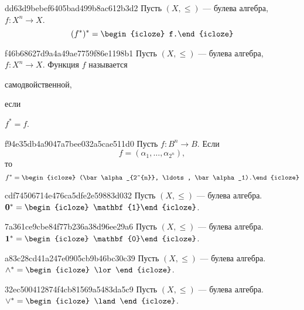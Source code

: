 \begin{note}{dd63d9bebef6405bad499b8ac612b3d2}
    Пусть \({ (X, \leqslant) }\) --- булева алгебра, \({ f : X^{n} \to X }\).
    \[
        (f^*)^* = \begin{icloze}{1}f.\end{icloze}
    \]
\end{note}

\begin{note}{f46b68627d9a4a49ae7759f86e1198b1}
    Пусть \({ (X, \leqslant) }\) --- булева алгебра, \({ f : X^{n} \to X }\).
    Функция \({ f }\) называется \begin{icloze}{1}самодвойственной,\end{icloze} если \begin{icloze}{2}\({ f^* = f }\).\end{icloze}
\end{note}

\begin{note}{f94e35db4a9047a7bee032a5cae511d0}
    Пусть \({ f : B^{n} \to B }\).
    Если
    \[
        f = (\alpha_1, \ldots, \alpha_{2^{n}}),
    \]
    то
    \[
        f^* = \begin{icloze}{1}(\bar \alpha_{2^{n}}, \ldots, \bar \alpha_1).\end{icloze}
    \]
\end{note}

\begin{note}{cdf74506714e476ca5dfe2e59883d032}
    Пусть \({ (X, \leqslant) }\) --- булева алгебра. \({ \mathbf{0}^* = \begin{icloze}{1}\mathbf{1}\end{icloze} }\).
\end{note}

\begin{note}{7a361ce9cbe84f77b236a38d96ee29a6}
    Пусть \({ (X, \leqslant) }\) --- булева алгебра. \({ \mathbf{1}^* = \begin{icloze}{1}\mathbf{0}\end{icloze} }\).
\end{note}

\begin{note}{a83c28cd41a247e0905cb9b46bc30c39}
    Пусть \({ (X, \leqslant) }\) --- булева алгебра. \({ \land^* = \begin{icloze}{1}\lor\end{icloze} }\).
\end{note}

\begin{note}{32ec500412874f4cb81569a5483da5c9}
    Пусть \({ (X, \leqslant) }\) --- булева алгебра. \({ \lor^* = \begin{icloze}{1}\land\end{icloze} }\).
\end{note}

